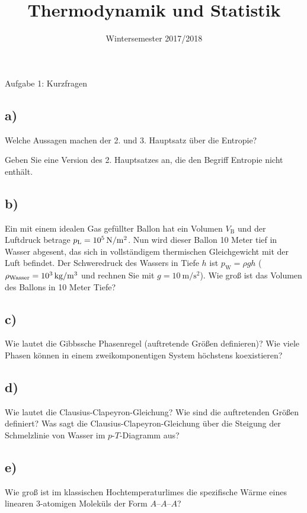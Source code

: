 

\subject{TuS}
\title{Thermodynamik und Statistik}
\date{
    Wintersemester 2017/2018
}



\maketitle
\thispagestyle{empty}
\newpage


\begin{aufgabe}{Aufgabe 1: Kurzfragen}
    \subsection{a)}
    Welche Aussagen machen der 2. und 3. Hauptsatz über die Entropie?

    Geben Sie eine Version des 2. Hauptsatzes an, die den Begriff Entropie nicht enthält.

    \subsection{b)}
    Ein mit einem idealen Gas gefüllter Ballon hat ein Volumen $V_\text{B}$ und der Luftdruck betrage $p_\text{L} = \SI{E5}{\newton\per\square\meter}$.
    Nun wird dieser Ballon 10 Meter tief in Wasser abgesent, das sich in vollständigem thermischen Gleichgewicht mit der Luft befindet.
    Der Schweredruck des Wassers in Tiefe $h$ ist $p_\text{W} = \rho g h$ ($\rho_\text{Wasser} = \SI{E3}{\kilogram\per\cubic\meter}$ und rechnen Sie mit $g = \SI{10}{\meter\per\square\second}$).
    Wie groß ist das Volumen des Ballons in 10 Meter Tiefe?

    \subsection{c)}
    Wie lautet die Gibbssche Phasenregel (auftretende Größen definieren)?
    Wie viele Phasen können in einem zweikomponentigen System höchstens koexistieren?

    \subsection{d)}
    Wie lautet die Clausius-Clapeyron-Gleichung?
    Wie sind die auftretenden Größen definiert?
    Was sagt die Clausius-Clapeyron-Gleichung über die Steigung der Schmelzlinie von Wasser im $p$-$T$-Diagramm aus?

    \subsection{e)}
    Wie groß ist im klassischen Hochtemperaturlimes die spezifische Wärme eines linearen 3-atomigen Moleküls der Form $A – A – A$?


\end{aufgabe}

